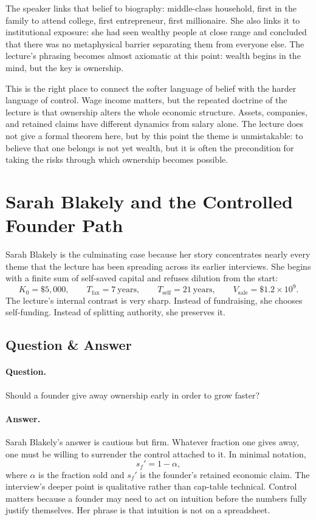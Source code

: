The speaker links that belief to biography: middle-class household, first in the family to attend college, first entrepreneur, first millionaire. She also links it to institutional exposure: she had seen wealthy people at close range and concluded that there was no metaphysical barrier separating them from everyone else. The lecture's phrasing becomes almost axiomatic at this point: wealth begins in the mind, but the key is ownership.

This is the right place to connect the softer language of belief with the harder language of control. Wage income matters, but the repeated doctrine of the lecture is that ownership alters the whole economic structure. Assets, companies, and retained claims have different dynamics from salary alone. The lecture does not give a formal theorem here, but by this point the theme is unmistakable: to believe that one belongs is not yet wealth, but it is often the precondition for taking the risks through which ownership becomes possible.

\section{Sarah Blakely and the Controlled Founder Path}

Sarah Blakely is the culminating case because her story concentrates nearly every theme that the lecture has been spreading across its earlier interviews. She begins with a finite sum of self-saved capital and refuses dilution from the start:
\begin{equation}
K_0 = \$5{,}000,\qquad T_{\mathrm{fax}} = 7\ \text{years},\qquad T_{\mathrm{self}} = 21\ \text{years},\qquad V_{\mathrm{sale}} = \$1.2 \times 10^{9}.
\end{equation}
The lecture's internal contrast is very sharp. Instead of fundraising, she chooses self-funding. Instead of splitting authority, she preserves it.

\subsection{Question \& Answer}

\paragraph{Question.} Should a founder give away ownership early in order to grow faster?

\paragraph{Answer.} Sarah Blakely's answer is cautious but firm. Whatever fraction one gives away, one must be willing to surrender the control attached to it. In minimal notation,
\begin{equation}
s_f' = 1-\alpha,
\end{equation}
where \(\alpha\) is the fraction sold and \(s_f'\) is the founder's retained economic claim. The interview's deeper point is qualitative rather than cap-table technical. Control matters because a founder may need to act on intuition before the numbers fully justify themselves. Her phrase is that intuition is not on a spreadsheet.

